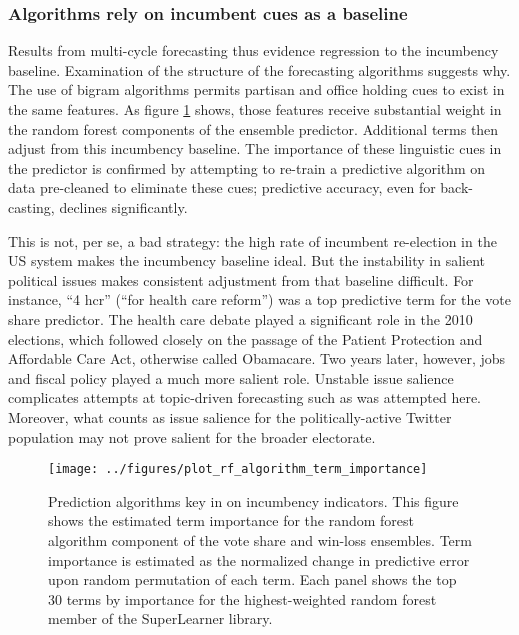 \documentclass{article}
\begin{document}
\subsubsection{Algorithms rely on incumbent cues as a baseline}
\label{sec:algor-behav-perf}

Results from multi-cycle forecasting thus evidence regression to
the incumbency baseline. Examination of the structure of the
forecasting algorithms suggests why. The use of
bigram algorithms permits partisan and office holding cues to exist in
the same features. As figure \ref{fig:rf-term-importance} shows, those
features receive substantial weight in the random forest components of
the ensemble predictor. Additional terms then adjust from this incumbency baseline. The
importance of these linguistic cues in the predictor is confirmed by
attempting to re-train a predictive algorithm on data pre-cleaned to
eliminate these cues; predictive accuracy, even for back-casting,
declines significantly.

This is not, per se, a bad strategy: the high rate of incumbent
re-election in the US system makes the incumbency baseline ideal. But
the instability in salient political issues makes consistent
adjustment from that baseline difficult. For instance, ``4 hcr''
(``for health care reform'') was a
top predictive term for the vote share predictor. The health care debate played a
significant role in the 2010 elections, which followed closely on the
passage of the Patient Protection and Affordable Care Act, otherwise
called Obamacare. Two years later, however, jobs and fiscal policy
played a much more salient role. Unstable issue salience complicates
attempts at topic-driven forecasting such as was attempted
here. Moreover, what counts as issue salience for the
politically-active Twitter population may not prove salient for the
broader electorate. 

\begin{figure}[ht]
  \centering
  \texttt{[image: ../figures/plot\_rf\_algorithm\_term\_importance]}
  \caption{Prediction algorithms key in on incumbency
    indicators. This figure shows the estimated term importance for the random forest algorithm component
    of the vote share and win-loss ensembles. Term importance is
    estimated as the normalized change in predictive error upon
    random permutation of each term. Each panel shows the top
    30 terms by importance for the highest-weighted random forest
    member of the SuperLearner library.}
  \label{fig:rf-term-importance}
\end{figure}
\end{document}
